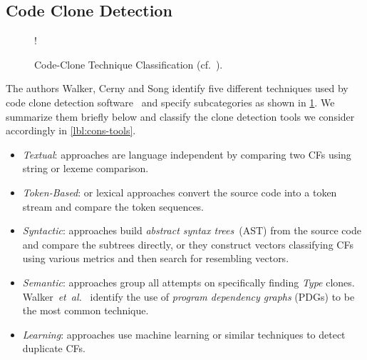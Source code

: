 \documentclass[10pt,journal,compsoc]{IEEEtran}
\def\T#1{\textsl{Type\nobreakdash-#1}}
\begin{document}
\subsection{Code Clone Detection}
\begin{figure}
\resizebox\linewidth!{\sffamily{}}%
\caption{Code-Clone Technique Classification (cf.~\cite[Figure 1]{10.1145/3381307.3381310}).}
\label{fig:cats}
\end{figure}
The authors Walker, Cerny and Song identify five different techniques used by code clone detection software~\cite{10.1145/3381307.3381310} and specify subcategories as shown in \cref{fig:cats}.
We summarize them briefly below and classify the clone detection tools we consider accordingly in
\cref{lbl:cons-tools}.
\def\expl#1{\item\textit{#1}:}%
\begin{itemize}
  \expl{Textual} approaches are language independent by comparing two CFs using string or lexeme comparison.
  \expl{Token-Based} or lexical approaches convert the source code into a token stream and compare the token sequences.
  \expl{Syntactic} approaches build \textsl{abstract syntax trees}~(AST) from the source code and compare the subtrees directly, or they construct vectors classifying CFs using various metrics and then search for resembling vectors.
  \expl{Semantic} approaches group all attempts on specifically finding \T4 clones. Walker~\textsl{et~al.}~\cite{10.1145/3381307.3381310} identify the use of \textsl{program dependency graphs} (PDGs) to be the most common technique.
  \expl{Learning} approaches use machine learning or similar techniques to detect duplicate CFs. %
\end{itemize}
\end{document}

